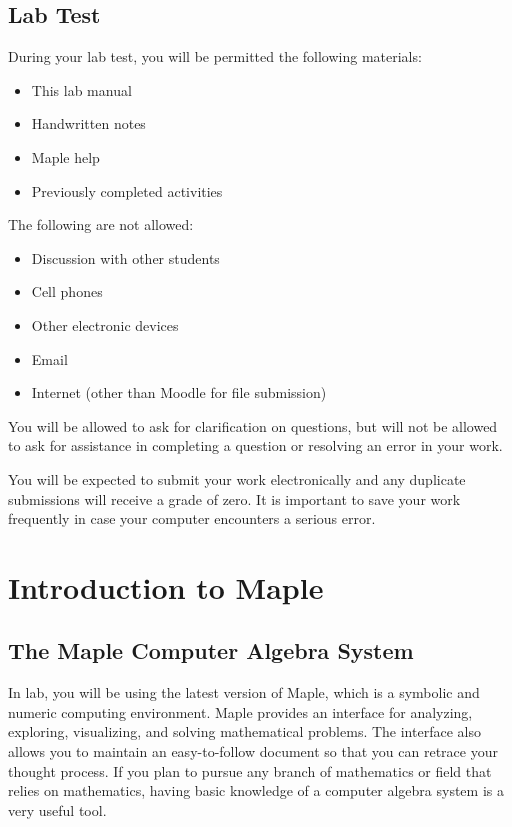 \section*{Lab Test}
During your lab test, you will be permitted the following materials:
\vspace*{-1ex}
\begin{multicols}{2}
\begin{itemize}
\item This lab manual
\item Handwritten notes
\item Maple help
\columnbreak
\item Previously completed activities
\vfill\null
\end{itemize}
\end{multicols}
\noindent The following are not allowed:
\vspace*{-1ex}
\begin{multicols}{2}
\begin{itemize}
\item Discussion with other students
\item Cell phones
\item Other electronic devices
\item Email
\item Internet (other than Moodle for file submission)
\vfill\null
\end{itemize}
\end{multicols}
You will be allowed to ask for clarification on questions, but will not be allowed to ask for assistance in completing a question or resolving an error in your work.
\par
You will be expected to submit your work electronically and any duplicate submissions will receive a grade of zero. It is important to save your work frequently in case your computer encounters a serious error.

\chapter{Introduction to Maple}
\label{chp:introduction}

\section*{The Maple Computer Algebra System}
In lab, you will be using the latest version of Maple, which is a symbolic and numeric computing environment. Maple provides an interface for analyzing, exploring, visualizing, and solving mathematical problems. The interface also allows you to maintain an easy-to-follow document so that you can retrace your thought process. If you plan to pursue any branch of mathematics or field that relies on mathematics, having basic knowledge of a computer algebra system is a very useful tool.

